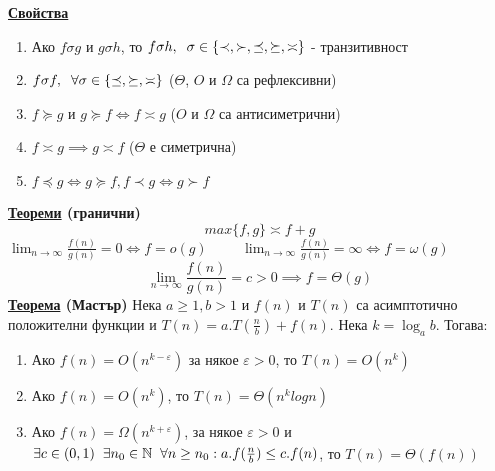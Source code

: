 \documentclass{article}
\begin{document}
\textbf{\underline{Свойства}}
\begin{enumerate}
    \item Ако $f \sigma g$ и $g \sigma h$, то $f \sigma h, \hspace{0.2cm} \sigma \in \{\prec, \succ, \preceq, \succeq, \asymp\}$ -
    транзитивност
    \item $f \sigma f, \hspace{0.2cm} \forall \sigma \in \{\preceq, \succeq, \asymp\}$ ($\Theta$, $O$ и $\Omega$ са рефлексивни)
    \item $f \succeq g$ и $g \succeq f \iff f \asymp g$ ($O$ и $\Omega$ са антисиметрични)
    \item $f \asymp g \implies g \asymp f$ ($\Theta$ е симетрична)
    \item $f \preceq g \iff g \succeq f, f \prec g \iff g \succ f$
\end{enumerate}
\textbf{\underline{Теореми} (гранични)} \newline
$$max\{f, g\} \asymp f + g$$
$\lim_{n \rightarrow \infty}\frac{f(n)}{g(n)} = 0 \iff f = o(g) \hspace{1cm} \lim_{n \rightarrow \infty}\frac{f(n)}{g(n)} =
\infty \iff f = \omega(g)$
$$\lim_{n \rightarrow \infty}\frac{f(n)}{g(n)} = c > 0 \implies f = \Theta(g)$$ \newline\newline
\textbf{\underline{Теорема} (Мастър)} \newline
Нека $a \ge 1, b > 1$ и $f(n)$ и $T(n)$ са асимптотично положителни функции и $T(n) = a.T(\frac{n}{b}) + f(n)$. Нека
$k = \log_ab$. Тогава:
\begin{enumerate}
    \item Ако $f(n) = O(n^{k - \varepsilon})$ за някое $\varepsilon > 0$, то $T(n) = O(n^k)$
    \item Ако $f(n) = O(n^k)$, то $T(n) = \Theta(n^klogn)$
    \item Ако $f(n) = \Omega(n^{k + \varepsilon})$, за някое $\varepsilon > 0$ и $\exists c \in (0, 1) \hspace{0.2cm}
    \exists n_0 \in \mathbb{N} \hspace{0.2cm} \forall n \ge n_0 : a.f(\frac{n}{b}) \le c.f(n)$, то $T(n) = \Theta(f(n))$
\end{enumerate}
\end{document}
